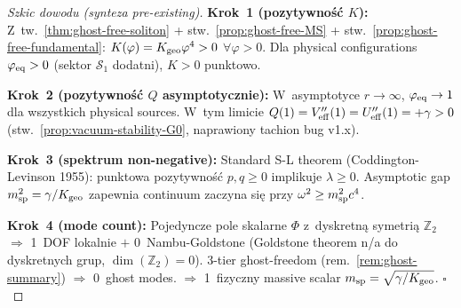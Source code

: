 \begin{proof}[Szkic dowodu (synteza pre-existing)]
\textbf{Krok~1 (pozytywno\'s\'c $K$):}
Z~tw.~\ref{thm:ghost-free-soliton} + stw.~\ref{prop:ghost-free-MS} +
stw.~\ref{prop:ghost-free-fundamental}: $K(\varphi) = K_{\rm geo}\varphi^4 > 0$
$\forall\varphi > 0$. Dla physical configurations
$\varphi_{\rm eq} > 0$ (sektor $\mathcal{S}_1$ dodatni), $K > 0$
punktowo. \checkmark

\textbf{Krok~2 (pozytywno\'s\'c $Q$ asymptotycznie):}
W~asymptotyce $r\to\infty$, $\varphi_{\rm eq}\to 1$ dla wszystkich
physical sources. W~tym limicie
$Q(1) = V''_{\rm eff}(1) = U''_{\rm eff}(1) = +\gamma > 0$
(stw.~\ref{prop:vacuum-stability-G0}, naprawiony tachion bug v1.x).
\checkmark

\textbf{Krok~3 (spektrum non-negative):}
Standard S-L theorem (Coddington-Levinson 1955): punktowa pozytywno\'s\'c
$p, q \geq 0$ implikuje $\lambda \geq 0$. Asymptotic gap
$m_{\rm sp}^2 = \gamma/K_{\rm geo}$ zapewnia continuum zaczyna si\k{e}
przy $\omega^2 \geq m_{\rm sp}^2 c^4$. \checkmark

\textbf{Krok~4 (mode count):}
Pojedyncze pole skalarne $\Phi$ z~dyskretn\k{a} symetri\k{a} $\mathbb{Z}_2$
$\Rightarrow$ 1~DOF lokalnie $+$ 0~Nambu-Goldstone (Goldstone theorem
n/a do dyskretnych grup, $\dim(\mathbb{Z}_2) = 0$). 3-tier ghost-freedom
(rem.~\ref{rem:ghost-summary}) $\Rightarrow$ 0~ghost modes.
$\Rightarrow$ 1~fizyczny massive scalar
$m_{\rm sp} = \sqrt{\gamma/K_{\rm geo}}$. $\square$
\end{proof}

